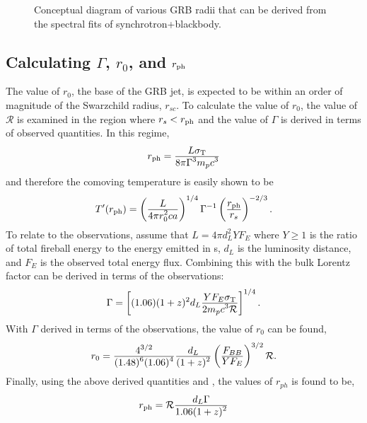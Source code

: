 \begin{figure}[t]
  \centering
  \caption{Conceptual diagram of various GRB radii that can be derived from the spectral fits of synchrotron+blackbody.}
  \label{fig:grbjet2}
\end{figure}


\subsection{Calculating $\Gamma$, $r_0$, and $r_{\rm ph}$ }
The value of $r_0$, the base of the GRB jet, is expected to be within
an order of magnitude of the Swarzchild radius, $r_{sc}$. To calculate
the value of $r_0$, the value of $\mathcal{R}$ is examined in the
region where $r_s<r_{\rm ph}$ and the value of $\Gamma$ is derived in
terms of observed quantities. In this regime,
\begin{equation}
  \label{eq:rph2}
  r_{\rm ph}=\dover{L \sigma_{\rm T}}{8 \pi \Gamma^3 m_p c^3}
\end{equation}
and therefore the comoving temperature is easily shown to be
\begin{equation}
  \label{eq:tempcalc}
  T^{\prime}(r_{\rm ph})=\left( \dover{L}{4 \pi r_0^2 c a}  \right)^{1/4}\Gamma^{-1}\left( \dover{r_{\rm ph}}{r_s}  \right)^{-2/3}.
\end{equation}
To relate  to the observations, assume that
$L=4\pi d_L^2YF_E$ where $Y\ge 1$ is the ratio of total fireball
energy to the energy emitted in {\gray}s, $d_L$ is the luminosity
distance, and $F_E$ is the observed total energy flux. Combining this
with  the bulk Lorentz factor can be derived in
terms of the observations:
\begin{equation}
  \label{eq:blf}
  \Gamma = \left[(1.06)(1+z)^2d_L\dover{YF_E \sigma_{\rm T}}{2 m_p c^3 \mathcal{R}}  \right]^{1/4}.
\end{equation}
With $\Gamma$ derived in terms of the observations, the value of $r_0$ can be found,
\begin{equation}
  \label{eq:r0}
  r_0 = \dover{4^{3/2}}{(1.48)^6(1.06)^4}\dover{d_L}{(1+z)^2}\left( \dover{F_{BB}}{Y F_E} \right)^{3/2}\mathcal{R}.
\end{equation}
Finally, using the above derived quantities and , the values of $r_{ph}$ is found to be,
\begin{equation}
  \label{eq:rphObs}
  r_{\rm ph}=\mathcal{R}\dover{d_L\Gamma}{1.06 (1+z)^2}
\end{equation}



